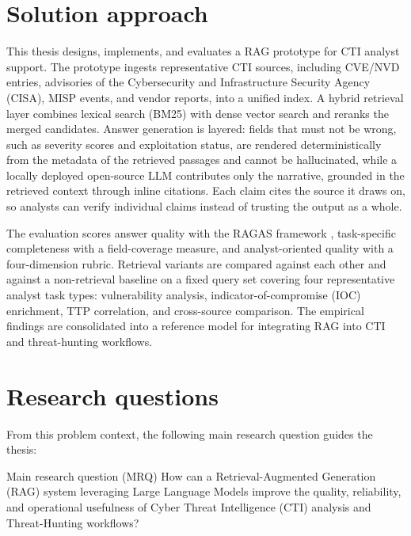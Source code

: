 \section{Solution approach}
\label{sec:solution-approach}

This thesis designs, implements, and evaluates a RAG prototype for CTI
analyst support. The prototype ingests representative CTI sources, including
CVE/NVD entries, advisories of the Cybersecurity and Infrastructure
Security Agency (CISA), MISP events, and vendor reports, into a
unified index. A hybrid retrieval layer combines lexical search (BM25) with
dense vector search and reranks the merged candidates. Answer generation
is layered: fields that must not be wrong, such as severity scores and
exploitation status, are rendered deterministically from the metadata of
the retrieved passages and cannot be hallucinated, while a locally
deployed open-source LLM contributes only the narrative, grounded in the
retrieved context through inline citations. Each claim cites the source
it draws on, so analysts can verify individual claims instead of
trusting the output as a whole.

The evaluation scores answer quality with the RAGAS framework
\parencite{es2023ragas}, task-specific completeness with a field-coverage
measure, and analyst-oriented quality with a four-dimension rubric.
Retrieval variants are compared against each other and against a
non-retrieval baseline on a fixed query set covering four representative
analyst task types: vulnerability analysis, indicator-of-compromise
(IOC) enrichment, TTP correlation, and cross-source comparison. The empirical findings are
consolidated into a reference model for integrating RAG into CTI and
threat-hunting workflows.

\section{Research questions}
\label{sec:research-questions}

From this problem context, the following main research question guides
the thesis:

\begin{rqbox}{Main research question (MRQ)}
    How can a Retrieval-Augmented Generation (RAG) system leveraging Large
    Language Models improve the quality, reliability, and operational
    usefulness of Cyber Threat Intelligence (CTI) analysis and
    Threat-Hunting workflows?
\end{rqbox}


